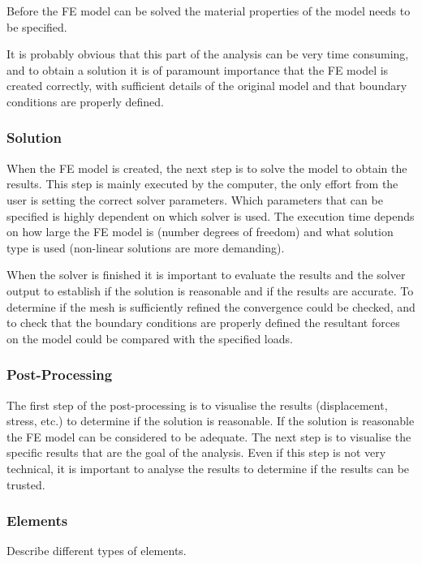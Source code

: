 Before the FE model can be solved the material properties of the model needs to be specified.

It is probably obvious that this part of the analysis can be very time consuming, and to obtain a solution it is of paramount importance that the FE model is created correctly, with sufficient details of the original model and that boundary conditions are properly defined.

\subsubsection{Solution} %
\label{ssub:solution}
When the FE model is created, the next step is to solve the model to obtain the results. This step is mainly executed by the computer, the only effort from the user is setting the correct solver parameters. Which parameters that can be specified is highly dependent on which solver is used. The execution time depends on how large the FE model is (number degrees of freedom) and what solution type is used (non-linear solutions are more demanding).

When the solver is finished it is important to evaluate the results and the solver output to establish if the solution is reasonable and if the results are accurate. To determine if the mesh is sufficiently refined the convergence could be checked, and to check that the boundary conditions are properly defined the resultant forces on the model could be compared with the specified loads.~\cite[p.~303-324]{adams99}

\subsubsection{Post-Processing} %
\label{ssub:post_processing}
The first step of the post-processing is to visualise the results (displacement, stress, etc.) to determine if the solution is reasonable. If the solution is reasonable the FE model can be considered to be adequate. The next step is to visualise the specific results that are the goal of the analysis. Even if this step is not very technical, it is important to analyse the results to determine if the results can be trusted.

\subsubsection{Elements} %
\label{ssub:elements}
Describe different types of elements.

